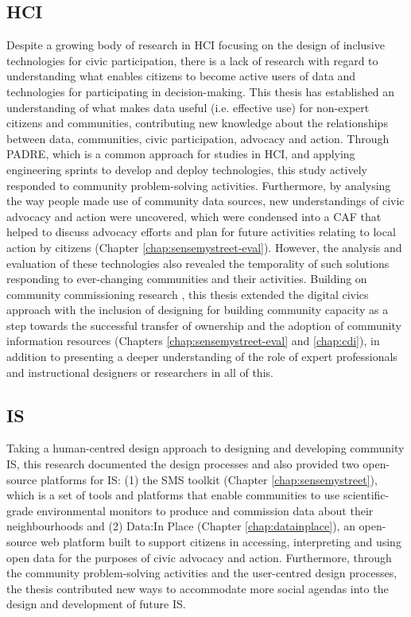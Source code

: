 \subsection{HCI}
Despite a growing body of research in HCI focusing on the design of inclusive technologies for civic participation, there is a lack of research with regard to understanding what enables citizens to become active users of data and technologies for participating in decision-making. This thesis has established an understanding of what makes data useful (i.e. effective use) for non-expert citizens and communities, contributing new knowledge about the relationships between data, communities, civic participation, advocacy and action. Through PADRE, which is a common approach for studies in HCI, and applying engineering sprints to develop and deploy technologies, this study actively responded to community problem-solving activities. Furthermore, by analysing the way people made use of community data sources, new understandings of civic advocacy and action were uncovered, which were condensed into a CAF that helped to discuss advocacy efforts and plan for future activities relating to local action by citizens (Chapter \ref{chap:sensemystreet-eval}). However, the analysis and evaluation of these technologies also revealed the temporality of such solutions responding to ever-changing communities and their activities. Building on community commissioning research \citep{garbett_designing_2017}, this thesis extended the digital civics approach \citep{olivier_digital_2015,vlachokyriakos_digital_2016,asad_tap_2017} with the inclusion of designing for building community capacity as a step towards the successful transfer of ownership and the adoption of community information resources (Chapters \ref{chap:sensemystreet-eval} and \ref{chap:cdi}), in addition to presenting a deeper understanding of the role of expert professionals and instructional designers or researchers in all of this.

\subsection{IS}
Taking a human-centred design approach to designing and developing community IS, this research documented the design processes and also provided two open-source platforms for IS: (1) the SMS toolkit (Chapter \ref{chap:sensemystreet}), which is a set of tools and platforms that enable communities to use scientific-grade environmental monitors to produce and commission data about their neighbourhoods and (2) Data:In Place (Chapter \ref{chap:datainplace}), an open-source web platform built to support citizens in accessing, interpreting and using open data for the purposes of civic advocacy and action. Furthermore, through the community problem-solving activities and the user-centred design processes, the thesis contributed new ways to accommodate more social agendas into the design and development of future IS.

